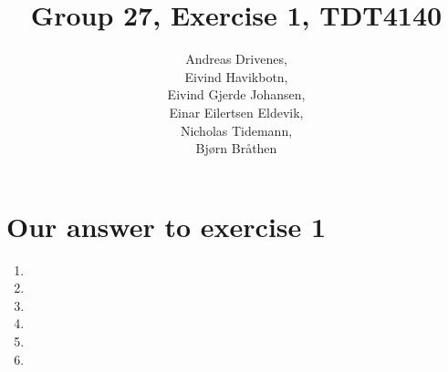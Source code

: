 \documentclass[english, a4paper]{article}
\title{Group 27, Exercise 1, TDT4140}
\author{	Andreas Drivenes,\\
		Eivind Havikbotn,\\
		Eivind Gjerde Johansen,\\
		Einar Eilertsen Eldevik,\\
		Nicholas Tidemann,\\
		Bjørn Bråthen\\
}
\begin{document}

\maketitle

\section{Our answer to exercise 1}
\begin{enumerate}

\item{}

\item{}

\item{}

\item{}
\newpage
\item{}

\newpage
\item{}

\end{enumerate}

\end{document}
